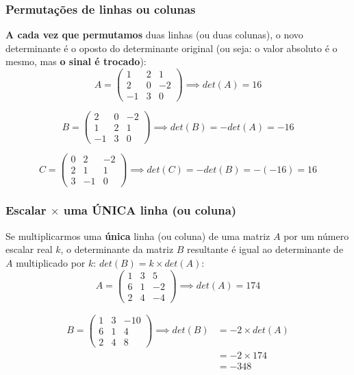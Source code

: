 \documentclass[pdftex, brazil]{beamer}
\begin{document}
\begin{frame}[t]
  \frametitle{Permutações de linhas ou colunas}
  \textbf{A cada vez que permutamos} duas linhas (ou duas colunas), o novo
  determinante é o oposto do determinante original (ou seja: o valor absoluto é
  o mesmo, mas \textbf{o sinal é trocado}):
  $$A = \begin{pmatrix}
    1 & 2 & 1\\
    2 & 0 & -2\\
    -1 & 3 & 0\end{pmatrix} \implies det(A) = 16$$

  $$B = \begin{pmatrix}
    2 & 0 & -2\\
    1 & 2 & 1\\
    -1 & 3 & 0\end{pmatrix} \implies det(B) = -det(A) = -16$$

  $$C = \begin{pmatrix}
    0 & 2 & -2\\
    2 & 1 & 1\\
    3 & -1 & 0\end{pmatrix} \implies det(C) = -det(B) = -(-16) = 16$$
\end{frame}

\begin{frame}[t]
  \frametitle{Escalar $\times$ uma ÚNICA linha (ou coluna)}
  Se multiplicarmos uma \textbf{única} linha (ou coluna) de uma matriz $A$ por
  um número escalar real $k$, o determinante da matriz $B$ resultante é igual ao
  determinante de $A$ multiplicado por $k$: $det(B) = k \times det(A)$:
  $$A = \begin{pmatrix}
    1 & 3 & 5\\
    6 & 1 & -2\\
    2 & 4 & -4\end{pmatrix} \implies det(A) = 174$$

  \begin{equation*}\begin{split}B = \begin{pmatrix}
    1 & 3 & -10\\
    6 & 1 & 4\\
    2 & 4 & 8\end{pmatrix} \implies det(B) &= -2 \times det(A)\\
                                           &= -2 \times 174\\
                                           &= -348\end{split}\end{equation*}
\end{frame}
\end{document}
